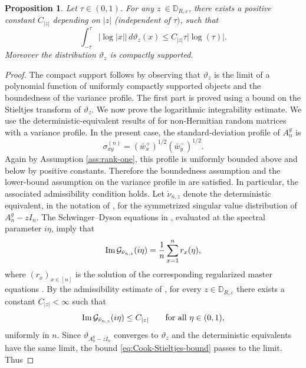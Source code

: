 \documentclass[11pt,oneside]{amsart}
\theoremstyle{plain}
\newtheorem{proposition}[theorem]{Proposition}
\numberwithin{equation}{section}
\newcommand{\eps}{\varepsilon}
\newcommand{\thetalimit}{\vartheta_z}
\begin{document}
\begin{proposition} \label{prop:integrability}
Let $\tau \in (0,1)$. For any $z\ \in \mathbb{D}_{R,\eps}$, there exists a positive constant $C_{|z|}$ depending on $|z|$ (independent of $\tau)$, such that 
    \begin{equation}
        \int_{-\tau}^\tau |\log|x||\,d\thetalimit(x) \le C_{|z|} \tau |\log(\tau)|.
    \end{equation}
Moreover the distribution $\vartheta_z$ is compactly supported.
\end{proposition}
\begin{proof}
The compact support follows by observing that $\thetalimit$ is the limit of a polynomial function of uniformly compactly supported objects and the boundedness of the variance profile.
The first part is proved using a bound on the Stieltjes transform of $\thetalimit$. 
We now prove the logarithmic integrability estimate. We use the deterministic-equivalent results of \cite{CookI} for non-Hermitian random matrices with a variance profile. In the present case, the standard-deviation profile of $A_n^g$ is
\[
        \sigma_{xy}^{(n)}
        =
        (\bar w_x^+)^{1/2}(\bar w_y^-)^{1/2}.
\]
Again by Assumption \ref{ass:rank-one}, this profile is uniformly bounded above and below by positive constants. Therefore the boundedness assumption and the lower-bound assumption on the variance profile in \cite{CookI} are satisfied. In particular, the associated admissibility condition holds. Let $\check\nu_{n,z}$ denote the deterministic equivalent, in the notation of \cite{CookI}, for the symmetrized singular value distribution of $A_n^g-zI_n$. The Schwinger--Dyson equations in \cite[equation (2.23)]{CookI}, evaluated at the spectral parameter $i\eta$, imply that
\[
        {\rm Im}\,\mathcal G_{\check\nu_{n,z}}(i\eta)
        =
        \frac1n\sum_{x=1}^n r_x(\eta),
\]
where $(r_x)_{x\in[n]}$ is the solution of the corresponding regularized master equations \cite[Equation 2.7]{CookI}. By the admissibility estimate of \cite[Assumption {\bf A2}]{CookI}, for every $z\in\mathbb D_{R,\eps}$ there exists a constant $C_{|z|}<\infty$ such that
\begin{equation}
\label{eq:Cook-Stieltjes-bound}
        {\rm Im}\,\mathcal G_{\check\nu_{n,z}}(i\eta)
        \le C_{|z|}
        \qquad \text{for all } \eta\in(0,1),
\end{equation}
uniformly in $n$. Since $\vartheta_{A_n^g-zI_n}$ converges to $\thetalimit$ and the deterministic equivalents have the same limit, the bound \eqref{eq:Cook-Stieltjes-bound} passes to the limit. Thus

\end{proof}
\end{document}
